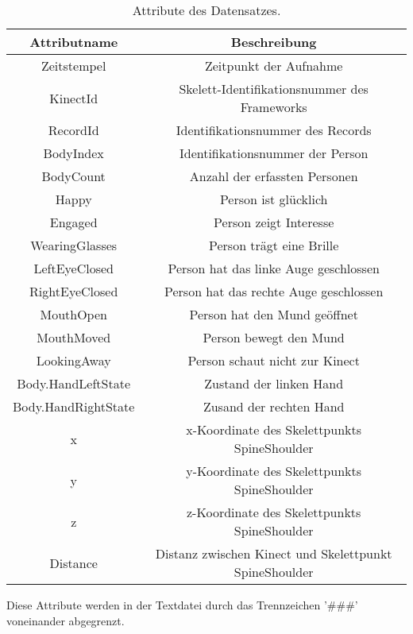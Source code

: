 \begin{table}[ht]
  \begin{center}
    \begin{tabular}{ |c|c| } 
      \hline
      Attributname & Beschreibung \\
      \hline \hline
      Zeitstempel & Zeitpunkt der Aufnahme \\
      \hline
      KinectId & Skelett-Identifikationsnummer des Frameworks  \\
      \hline
      RecordId & Identifikationsnummer des Records \\
      \hline
      BodyIndex & Identifikationsnummer der Person \\
      \hline
      BodyCount & Anzahl der erfassten Personen \\
      \hline
      Happy & Person ist glücklich \\
      \hline
      Engaged & Person zeigt Interesse \\
      \hline
      WearingGlasses & Person trägt eine Brille \\
      \hline
      LeftEyeClosed & Person hat das linke Auge geschlossen \\
      \hline
      RightEyeClosed & Person hat das rechte Auge geschlossen \\
      \hline
      MouthOpen & Person hat den Mund geöffnet \\
      \hline
      MouthMoved & Person bewegt den Mund\\
      \hline
      LookingAway & Person schaut nicht zur Kinect \\
      \hline
      Body.HandLeftState & Zustand der linken Hand \\
      \hline
      Body.HandRightState & Zusand der rechten Hand \\
      \hline
      x & x-Koordinate des Skelettpunkts SpineShoulder \\
      \hline
      y & y-Koordinate des Skelettpunkts SpineShoulder \\
      \hline
      z & z-Koordinate des Skelettpunkts SpineShoulder \\
      \hline
      Distance & Distanz zwischen Kinect und Skelettpunkt SpineShoulder \\
      \hline
    \end{tabular}
    \caption{Attribute des Datensatzes.}
    \label{tbl:AttributesDataset}
  \end{center}
\end{table}
Diese Attribute werden in der Textdatei durch das Trennzeichen '\#\#\#' voneinander abgegrenzt.
